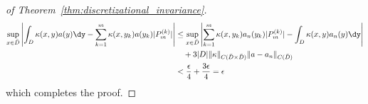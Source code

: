 {\begin{proof}[of Theorem~\ref{thm:discretizational_invariance}]
\begin{align*}
    \sup_{x \in \bar{D}} \left | \int_D \kappa(x,y) a(y) \dy - \sum_{k=1}^m \kappa(x,y_k) a(y_k) |P_m^{(k)}| \right | &\leq \sup_{x \in \bar{D}} \left | \sum_{k=1}^{m} \kappa(x,y_k) a_n(y_k) |P_{m}^{(k)}| - \int_D \kappa(x,y) a_n(y) \dy \right | \\
    &\quad+ 3 |D| \|\kappa\|_{C(\bar{D} \times \bar{D})} \|a - a_n\|_{C(\bar{D})} \\
    &< \frac{\epsilon}{4} + \frac{3 \epsilon}{4} = \epsilon
\end{align*}
which completes the proof.
\end{proof}
}

\section{}
\label{sec_proof:main_compact}

